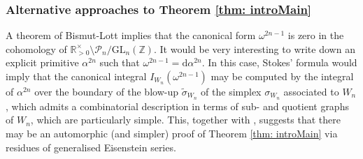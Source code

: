 \documentclass[10pt]{amsart}
\newcommand{\RR}{{\mathbb R}}
\newcommand{\ZZ}{{\mathbb Z}}
\newcommand{\dd}{\mathrm{d}}
\theoremstyle{plain}
\newcommand{\GL}{\mathrm{GL}}
\newcommand{\0}{\color{blue}{\mathsf{0}}}
\begin{document}
\subsubsection{Alternative approaches to Theorem \ref{thm: introMain}}
A theorem of Bismut-Lott \cite{BismutLott} implies that the canonical form $\omega^{2n-1}$ is zero in the cohomology of $\RR^{\times}_{>0} \setminus \mathcal{P}_{n}/\GL_{n}(\ZZ)$. It would be very interesting to write down an explicit primitive $\alpha^{2n}$ such that $\omega^{2n-1} = \dd \alpha^{2n}$. In this case, Stokes' formula would imply that
the canonical integral $I_{W_n}(\omega^{2n-1})$ may be computed by the integral of $\alpha^{2n}$ over the boundary of the blow-up $\widetilde{\sigma}_{W_n}$ of the simplex $\sigma_{W_n}$ associated to $W_n$, which admits a combinatorial description in terms of sub- and quotient graphs of $W_n$, which  are particularly simple. This, together with \cite{Grobner}, suggests that there may be an automorphic (and simpler) proof of Theorem \ref{thm: introMain} via residues of generalised Eisenstein series. 
\end{document}
